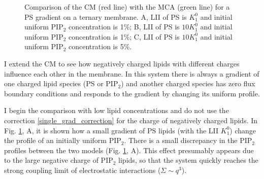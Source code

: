 \begin{figure}[!ht]
\caption[Comparison of CM with MCA for a ternary membrane with PS gradient]{Comparison of the CM (red line) with the MCA (green line) for a PS gradient on a ternary membrane. A, LII of PS is $K_1^0$ and initial uniform PIP$_2$ concentration is 1\%; B, LII of PS is $10 K_1^0$ and initial uniform PIP$_2$ concentration is 1\%; C, LII of PS is $10 K_1^0$ and initial uniform PIP$_2$ concentration is 5\%.}
\label{fig:double_grad1}
\end{figure}
I extend the CM to see how negatively charged lipids with different charges influence each other in the membrane. In this system there is always a gradient of one charged lipid species (PS or PIP$_2$) and another charged species has zero flux boundary conditions and responds to the gradient by changing its uniform profile.

I begin the comparison with low lipid concentrations and do not use the correction \eqref{single_grad_correction} for the charge of negatively charged lipids. In Fig. \ref{fig:double_grad1}, A, it is shown how a small gradient of PS lipids (with the LII $K_1^0$) change the profile of an initially uniform PIP$_2$. There is a small discrepancy in the PIP$_2$ profiles between the two models (Fig. \ref{fig:double_grad1}, A). This effect presumably appears due to the large negative charge of PIP$_2$ lipids, so that the system quickly reaches the strong coupling limit of electrostatic interactions ($\Sigma\sim q^3$).

